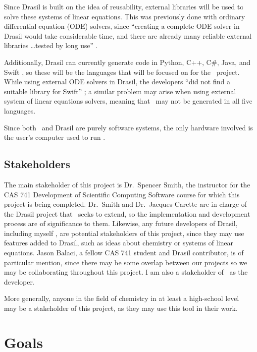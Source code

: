 \documentclass{article}
\begin{document}
Since Drasil is built on the idea of reusability, external libraries will be
used to solve these systems of linear equations. This was previously done with
ordinary differential equation (ODE) solvers, since ``creating a complete ODE
solver in Drasil would take considerable time, and there are already many
reliable external libraries \dots tested by long use''
\cite[p. 24]{chen_solving_2022}.

Additionally, Drasil can currently generate code in Python, C++, C\#, Java, and
Swift \cite{chen_solving_2022}, so these will be the languages that will be
focused on for the \progname~project. While using external ODE solvers in
Drasil, the developers ``did not find a suitable
library for Swift'' \cite[p.24]{chen_solving_2022}; a similar problem may
arise when using external system of linear equations solvers, meaning that
\progname~may not be generated in all five languages.

Since both \progname~and Drasil are purely software systems, the only
hardware involved is the user's computer used to run \progname.

\subsection{Stakeholders}
The main stakeholder of this project is Dr.~Spencer Smith, the instructor for
the CAS 741 Development of Scientific Computing Software course for which this
project is being completed. Dr.~Smith and Dr.~Jacques Carette are in charge of
the Drasil project that \progname~seeks to extend, so the implementation and
development process are of significance to them. Likewise, any future
developers of Drasil, including myself , are
potential stakeholders of this project, since they may use features added to
Drasil, such as ideas about chemistry or systems of linear equations. Jason
Balaci, a fellow CAS 741 student and Drasil contributor, is of particular 
mention, since
there may be some overlap between our projects so we may be collaborating
throughout this project. I am also a stakeholder of \progname~as the
developer.

More generally, anyone in the field of chemistry in at least a high-school level
may be a stakeholder of this project, as they may use this tool in their work.

\section{Goals}
\end{document}
